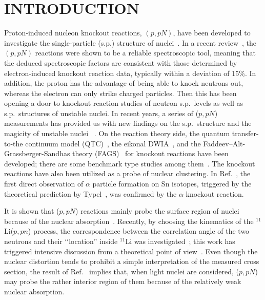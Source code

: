 \documentclass[%
 reprint,
superscriptaddress,
 amsmath,amssymb,
 aps,
]{revtex4-2}
\begin{document}
\maketitle


\section{INTRODUCTION}
Proton-induced nucleon knockout reactions, $(p,pN)$, have been developed to 
investigate the single-particle (s.p.) structure of nuclei~\cite{Jacob66,Jacob73}. 
In a recent review~\cite{Wakasa17}, the $(p,pN)$ reactions were shown to be 
a reliable spectroscopic tool, meaning that the deduced spectroscopic factors are 
consistent with those determined by electron-induced knockout reaction data, 
typically within a deviation of 15\%. In addition, the proton has the advantage of being able to knock neutrons out, whereas the electron can only strike charged particles. Then this has been opening a door to 
knockout reaction studies of neutron s.p.~levels as well as s.p.~structures of unstable nuclei. 
In recent years, a series of ($p,pN$) measurements has provided us with
new findings on the s.p.~structure and the magicity of unstable nuclei
~\cite{Olivier17,Kawase18,Elekes19,Taniuchi19,Chen19,Cortes20,Sun20,Lokotko20,
Tang20,Kubota20,Cortes20_2,ZYang21,Juhasz21,Juhasz21_V63,Browne21,Linh21}.
On the reaction theory side, the quantum transfer-to-the continuum model (QTC)~\cite{Moro15,Gomes18}, the eikonal DWIA~\cite{Aumann13}, and the Faddeev--Alt-Grassberger-Sandhas theory (FAGS)~\cite{Cravo16,Crespo2019,Mecca2019} for knockout reactions have been developed; there are some benchmark type studies among them~\cite{Yoshida18b,Gomez20}.
The knockout reactions have also been utilized as a probe of nuclear clustering.
In Ref.~\cite{Tanaka21}, the first direct observation of $\alpha$ particle formation on Sn isotopes, triggered by the theoretical prediction by Typel~\cite{Typel14}, was confirmed by the $\alpha$ knockout reaction. 

It is shown that ($p,pN$) reactions mainly probe the surface region 
of nuclei because of the nuclear absorption~\cite{Aumann13,Gomes18,Aumann21}.
Recently, by choosing the kinematics of the $^{11}$Li($p,pn$) process, the correspondence between the correlation angle of the two neutrons and their {\lq\lq}location'' inside $^{11}$Li was investigated~\cite{Kubota20}; this work has triggered  intensive discussion from a theoretical point of view~\cite{Casal2021,Yamagami2022}. Even though the nuclear distortion tends to prohibit a simple interpretation of the measured cross section, the result of Ref.~\cite{Kubota20} implies that, when light nuclei are considered, ($p,pN$) may probe the rather interior region of them because of the relatively weak nuclear absorption.
\end{document}
